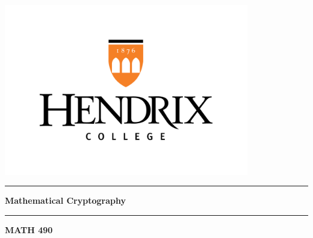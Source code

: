 \documentclass[12pt, oneside]{book}
\begin{document}
	

\newcommand{\titlestandin}[0]{Mathematical Cryptography}
\newcommand{\cussubtitle}[0]{MATH 490}
\newcommand{\startdate}[0]{August 26, 2024}
\newcommand{\customenddate}[0]{December 2, 2024}
\newcommand{\professor}[0]{Prof. Allie Ray, Ph.D.}




\begin{titlepage}
\begin{center}

\vspace*{-2cm}
\includegraphics[width=0.8\textwidth]{images/Hendrix Logo.png}\\
\vfill

\textcolor{horange}{\rule{\textwidth}{1.0pt}}

\vspace{2em}

{\huge \textbf{\titlestandin}}

\vspace{1em} %

\textcolor{horange}{\rule{\textwidth}{1.0pt}}

\vspace*{1\baselineskip}

{\LARGE \textbf{\cussubtitle}}

\begin{large}
\vspace*{2\baselineskip}


\end{large}
\end{center}
\end{titlepage}
\end{document}
